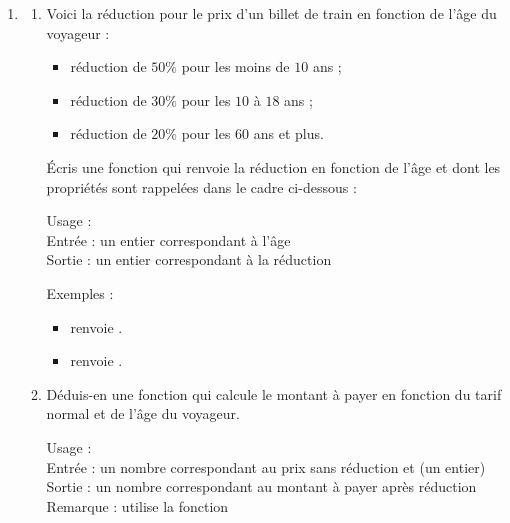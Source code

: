 \documentclass[11pt,class=report,crop=false]{standalone}
\begin{document}
\begin{activite}


\begin{enumerate}
  \item 
  
  \begin{enumerate}
  \item 
  Voici la réduction pour le prix d'un billet de train en fonction de l'âge du voyageur :
  \begin{itemize}
    \item réduction de $50\%$ pour les moins de $10$ ans ;
    \item réduction de $30\%$ pour les $10$ à $18$ ans ;
    \item réduction de $20\%$ pour les $60$ ans et plus.
  \end{itemize}
  
  \'Ecris une fonction  qui renvoie la réduction en fonction de l'âge et dont les propriétés sont rappelées dans le cadre ci-dessous :
\begin{fonction}[\ci{reduction()}]
  Usage :  \\
  Entrée : un entier correspondant à l'âge\\
  Sortie : un entier correspondant à la réduction
  
  \medskip
    
  Exemples : 
  \begin{itemize}
    \item {} renvoie .
    \item {} renvoie .
  \end{itemize}
  \end{fonction}  
  
  \item Déduis-en une fonction  qui calcule le montant à payer en fonction du tarif normal et de l'âge du voyageur.
  
\begin{fonction}[\ci{montant()}]
  Usage :  \\
  Entrée : un nombre  correspondant au prix sans réduction et  (un entier)\\
  Sortie : un nombre correspondant au montant à payer après réduction \\
  Remarque : utilise la fonction 
  \medskip
    

\end{fonction}
\end{enumerate}
\end{enumerate}
\end{activite}
\end{document}
